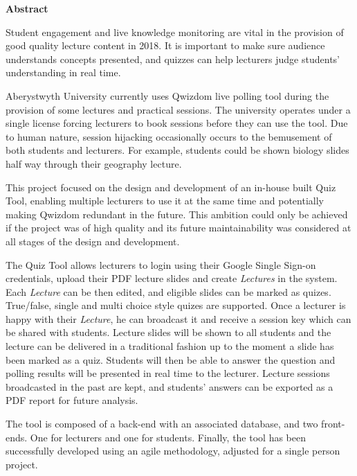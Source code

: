 \thispagestyle{empty}

\begin{center}
    {\LARGE\bf Abstract}
\end{center}
Student engagement and live knowledge monitoring are vital in the provision of good quality
lecture content in 2018. It is important to make sure audience understands concepts presented,
and quizzes can help lecturers judge students' understanding in real time.

Aberystwyth University currently uses Qwizdom\cite{1} live polling tool during the provision
of some lectures and practical sessions. The university operates under a single license
forcing lecturers to book sessions before they can use the tool. Due to human nature,
session hijacking occasionally occurs to the bemusement of both students and lecturers.
For example, students could be shown biology slides half way through their geography
lecture.

This project focused on the design and development of an in-house built Quiz Tool,
enabling multiple lecturers to use it at the same time and potentially making Qwizdom
redundant in the future. This ambition could only be achieved if the project was of
high quality and its future maintainability was considered at all stages of the design
and development.

The Quiz Tool allows lecturers to login using their Google Single Sign-on\cite{2} credentials,
upload their PDF lecture slides and create \textit{Lectures} in the system.
Each \textit{Lecture} can be then edited, and eligible slides can be marked as quizes.
True/false, single and multi choice style quizes are supported. Once a lecturer is happy with their
\textit{Lecture}, he can broadcast it and receive a session key which can be
shared with students. Lecture slides will be shown to all students and the
lecture can be delivered in a traditional fashion up to the moment a slide has been marked as a quiz.
Students will then be able to answer
the question and polling results will be presented in real time to the lecturer.
Lecture sessions broadcasted in the past are kept, and students' answers can be exported
as a PDF report for future analysis.

The tool is composed of a back-end with an associated database, and two
front-ends. One for lecturers and one for students. Finally, the tool has been
successfully developed using an agile methodology, adjusted for a single person
project.
